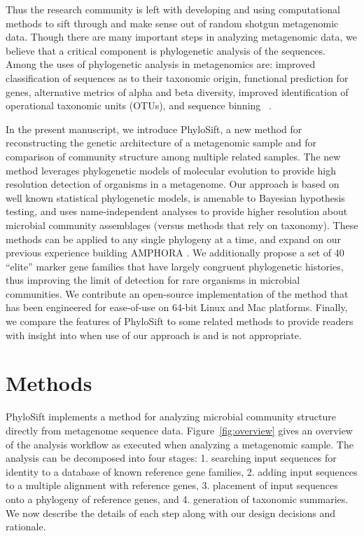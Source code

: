 \documentclass[10pt]{article}
\begin{document}
Thus the research community is left with developing and using computational methods to sift through and make sense out of random shotgun metagenomic data.
Though there are many important steps in analyzing metagenomic data, we believe that a critical component is phylogenetic analysis of the sequences.
Among the uses of phylogenetic analysis in metagenomics are: improved classification of sequences as to their taxonomic origin, functional prediction for genes, alternative metrics of alpha and beta diversity, improved identification of operational taxonomic units (OTUs), and sequence binning ~\cite{meyer2008metagenomics, Matsen2010, Evans2010, Kembel2011, Matsen2012, Stark2010, Wu2012, Brady2009, Brady2011, Sharpton2011}.

In the present manuscript, we introduce PhyloSift, a new method for reconstructing the genetic architecture of a metagenomic sample and for comparison of community structure among multiple related samples.
The new method leverages phylogenetic models of molecular evolution to provide high resolution detection of organisms in a metagenome.
Our approach is based on well known statistical phylogenetic models, is amenable to Bayesian hypothesis testing, and uses name-independent analyses to provide higher resolution about microbial community assemblages (versus methods that rely on taxonomy).
These methods can be applied to any single phylogeny at a time, and expand on our previous experience building AMPHORA \cite{WuEisen2008}.
We additionally propose a set of 40 ``elite'' marker gene families that have largely congruent phylogenetic histories, thus improving the limit of detection for rare organisms in microbial communities.
We contribute an open-source implementation of the method that has been engineered for ease-of-use on 64-bit Linux and Mac platforms.
Finally, we compare the features of PhyloSift to some related methods to provide readers with insight into when use of our approach is and is not appropriate.


\section*{Methods}

PhyloSift implements a method for analyzing microbial community structure directly from metagenome sequence data.
Figure~\ref{fig:overview} gives an overview of the analysis workflow as executed when analyzing a metagenomic sample.
The analysis can be decomposed into four stages: 1. searching input sequences for identity to a database of known reference gene families, 2. adding input sequences to a multiple alignment with reference genes, 3. placement of input sequences onto a phylogeny of reference genes, and 4. generation of taxonomic summaries. We now describe the details of each step along with our design decisions and rationale.
\end{document}
